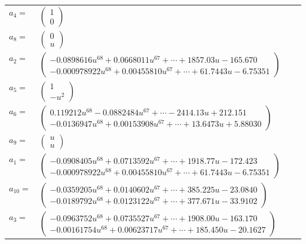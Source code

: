 \documentclass[1p]{elsarticle_modified}
\theoremstyle{definition}
\begin{document}
\begin{tabular}{m{7pt} m{180pt} m{7pt} m{180pt} }
\flushright $a_{4}=$&$\begin{pmatrix}1\\0\end{pmatrix}$ \\
\flushright $a_{8}=$&$\begin{pmatrix}0\\u\end{pmatrix}$ \\
\flushright $a_{2}=$&$\begin{pmatrix}-0.0898616 u^{68}+0.0668011 u^{67}+\cdots+1857.03 u-165.670\\-0.000978922 u^{68}+0.00455810 u^{67}+\cdots+61.7443 u-6.75351\end{pmatrix}$ \\
\flushright $a_{5}=$&$\begin{pmatrix}1\\- u^2\end{pmatrix}$ \\
\flushright $a_{6}=$&$\begin{pmatrix}0.119212 u^{68}-0.0882484 u^{67}+\cdots-2414.13 u+212.151\\-0.0136947 u^{68}+0.00153908 u^{67}+\cdots+13.6473 u+5.88030\end{pmatrix}$ \\
\flushright $a_{9}=$&$\begin{pmatrix}u\\u\end{pmatrix}$ \\
\flushright $a_{1}=$&$\begin{pmatrix}-0.0908405 u^{68}+0.0713592 u^{67}+\cdots+1918.77 u-172.423\\-0.000978922 u^{68}+0.00455810 u^{67}+\cdots+61.7443 u-6.75351\end{pmatrix}$ \\
\flushright $a_{10}=$&$\begin{pmatrix}-0.0359205 u^{68}+0.0140602 u^{67}+\cdots+385.225 u-23.0840\\-0.0189792 u^{68}+0.0123122 u^{67}+\cdots+377.671 u-33.9102\end{pmatrix}$ \\
\flushright $a_{3}=$&$\begin{pmatrix}-0.0963752 u^{68}+0.0735527 u^{67}+\cdots+1908.00 u-163.170\\-0.00161754 u^{68}+0.00623717 u^{67}+\cdots+185.450 u-20.1627\end{pmatrix}$ \\

\end{tabular}
\end{document}
